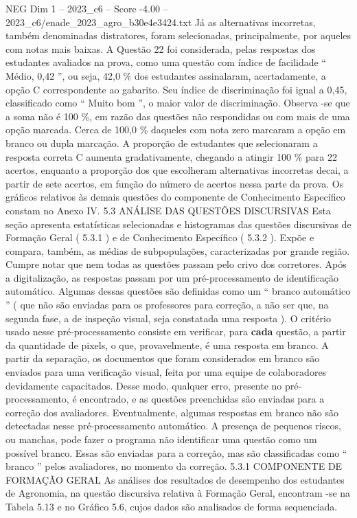 \begin{textsample}{NEG Dim 1 – 2023\_c6 – Score -4.00 – 2023\_c6/enade\_2023\_agro\_b30e4e3424.txt}
Já as alternativas incorretas, também denominadas distratores, foram selecionadas, principalmente, por aqueles com notas mais baixas.
A Questão 22 foi considerada, pelas respostas dos estudantes avaliados na prova, como uma questão com índice de facilidade “ Médio, 0,42 ”, ou seja, 42,0 \% dos estudantes assinalaram, acertadamente, a opção C correspondente ao gabarito.
Seu índice de discriminação foi igual a 0,45, classificado como “ Muito bom ”, o maior valor de discriminação.
Observa -se que a soma não é 100 \%, em razão das questões não respondidas ou com mais de uma opção marcada.
Cerca de 100,0 \% daqueles com nota zero marcaram a opção em branco ou dupla marcação.
A proporção de estudantes que selecionaram a resposta correta C aumenta gradativamente, chegando a atingir 100 \% para 22 acertos, enquanto a proporção dos que escolheram alternativas incorretas decai, a partir de sete acertos, em função do número de acertos nessa parte da prova.
Os gráficos relativos às demais questões do componente de Conhecimento Específico constam no Anexo IV. 5.3 ANÁLISE DAS QUESTÕES DISCURSIVAS Esta seção apresenta estatísticas selecionadas e histogramas das questões discursivas de Formação Geral ( 5.3.1 ) e de Conhecimento Específico ( 5.3.2 ).
Expõe e compara, também, as médias de subpopulações, caracterizadas por grande região.
Cumpre notar que nem todas as questões passam pelo crivo dos corretores.
Após a digitalização, as respostas passam por um pré-processamento de identificação automático.
Algumas dessas questões são definidas como um “ branco automático ” ( que não são enviadas para os professores para correção, a não ser que, na segunda fase, a de inspeção visual, seja constatada uma resposta ).
O critério usado nesse pré-processamento consiste em verificar, para \textbf{cada} questão, a partir da quantidade de pixels, o que, provavelmente, é uma resposta em branco.
A partir da separação, os documentos que foram considerados em branco são enviados para uma verificação visual, feita por uma equipe de colaboradores devidamente capacitados.
Desse modo, qualquer erro, presente no pré-processamento, é encontrado, e as questões preenchidas são enviadas para a correção dos avaliadores.
Eventualmente, algumas respostas em branco não são detectadas nesse pré-processamento automático.
A presença de pequenos riscos, ou manchas, pode fazer o programa não identificar uma questão como um possível branco.
Essas são enviadas para a correção, mas são classificadas como “ branco ” pelos avaliadores, no momento da correção. 5.3.1 COMPONENTE DE FORMAÇÃO GERAL As análises dos resultados de desempenho dos estudantes de Agronomia, na questão discursiva relativa à Formação Geral, encontram -se na Tabela 5.13 e no Gráfico 5.6, cujos dados são analisados de forma sequenciada.

\end{textsample}
